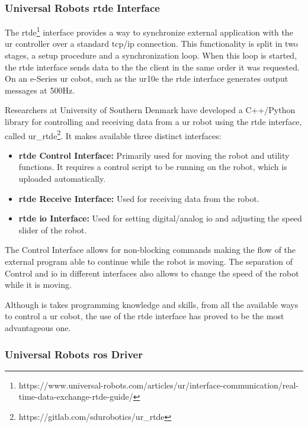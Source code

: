 \subsubsection{Universal Robots \acs{rtde} Interface}

\par The \ac{rtde}\footnote{https://www.universal-robots.com/articles/ur/interface-communication/real-time-data-exchange-rtde-guide/} interface provides a way to synchronize external application with the \ac{ur} controller over a standard \acs{tcp}/\acs{ip} connection. This functionality is split in two stages, a setup procedure and a synchronization loop. When this loop is started, the \ac{rtde} interface sends data to the the client in the same order it was requested. On an e-Series \ac{ur} cobot, such as the \ac{ur10e} the \ac{rtde} interface generates output messages at 500Hz. 
\par Researchers at University of Southern Denmark have developed a C++/Python library for controlling and receiving data from a \ac{ur} robot using the \ac{rtde} interface, called ur\_rtde\footnote{https://gitlab.com/sdurobotics/ur\_rtde}. It makes available three distinct interfaces: 

\begin{itemize}
    \item \textbf{\ac{rtde} Control Interface: }Primarily used for moving the robot and utility functions. It requires a control script to be running on the robot, which is uploaded automatically.
    \item \textbf{\ac{rtde} Receive Interface: }Used for receiving data from the robot.
    \item \textbf{\ac{rtde} \acs{io} Interface: }Used for setting digital/analog \acs{io} and adjusting the speed slider of the robot.
\end{itemize}

\noindent The Control Interface allows for non-blocking commands making the flow of the external program able to continue while the robot is moving. The separation of Control and \acs{io} in different interfaces also allows to change the speed of the robot while it is moving. 
\par Although is takes programming knowledge and skills, from all the available ways to control a \ac{ur} cobot, the use of the \ac{rtde} interface has proved to be the most advantageous one.

\subsubsection{Universal Robots \ac{ros} Driver}

